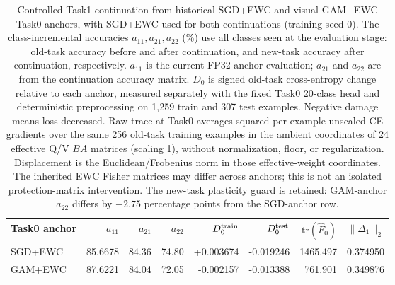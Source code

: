 \begin{table}[t]
\centering
\small
\caption{Controlled Task1 continuation from historical SGD+EWC and visual GAM+EWC Task0 anchors, with SGD+EWC used for both continuations (training seed 0). The class-incremental accuracies $a_{11},a_{21},a_{22}$ (\%) use all classes seen at the evaluation stage: old-task accuracy before and after continuation, and new-task accuracy after continuation, respectively. $a_{11}$ is the current FP32 anchor evaluation; $a_{21}$ and $a_{22}$ are from the continuation accuracy matrix. $D_0$ is signed old-task cross-entropy change relative to each anchor, measured separately with the fixed Task0 20-class head and deterministic preprocessing on 1,259 train and 307 test examples. Negative damage means loss decreased. Raw trace at Task0 averages squared per-example unscaled CE gradients over the same 256 old-task training examples in the ambient coordinates of 24 effective Q/V $BA$ matrices (scaling 1), without normalization, floor, or regularization. Displacement is the Euclidean/Frobenius norm in those effective-weight coordinates. The inherited EWC Fisher matrices may differ across anchors; this is not an isolated protection-matrix intervention. The new-task plasticity guard is retained: GAM-anchor $a_{22}$ differs by $-2.75$ percentage points from the SGD-anchor row.}
\label{tab:rq2_controlled_continuation}
\begin{tabular}{lrrrrrrr}
\toprule
Task0 anchor & $a_{11}$ & $a_{21}$ & $a_{22}$ & $D_0^{\rm train}$ & $D_0^{\rm test}$ & $\mathrm{tr}(\widehat F_0)$ & $\|\Delta_1\|_2$ \\
\midrule
SGD+EWC & 85.6678 & 84.36 & 74.80 & +0.003674 & -0.019246 & 1465.497 & 0.374950 \\
GAM+EWC & 87.6221 & 84.04 & 72.05 & -0.002157 & -0.013388 & 761.901 & 0.349876 \\
\bottomrule
\end{tabular}
\end{table}
